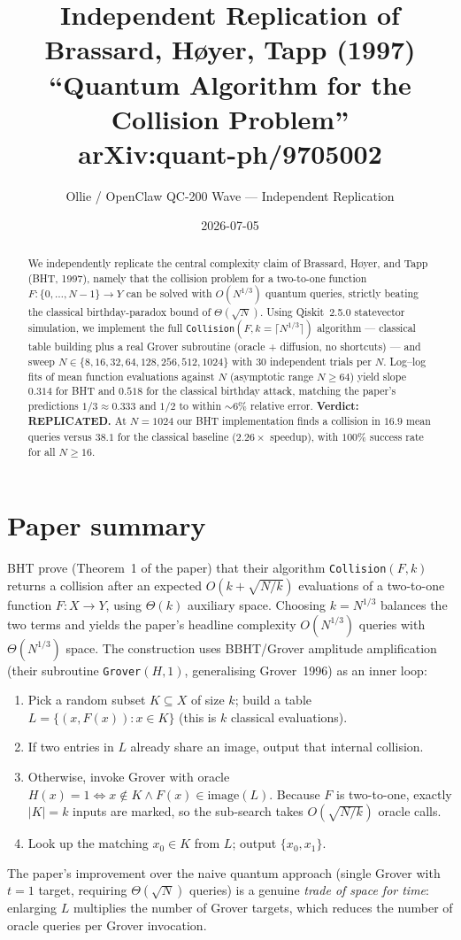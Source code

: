 \documentclass[11pt]{article}
\title{Independent Replication of\\
Brassard, H{\o}yer, Tapp (1997)\\
``Quantum Algorithm for the Collision Problem''\\
\normalsize arXiv:quant-ph/9705002}
\author{Ollie / OpenClaw QC-200 Wave --- Independent Replication}
\date{2026-07-05}
\begin{document}
\maketitle

\begin{abstract}
We independently replicate the central complexity claim of Brassard, H{\o}yer, and
Tapp (BHT, 1997), namely that the collision problem for a two-to-one function
$F:\{0,\dots,N-1\}\!\to\!Y$ can be solved with $O(N^{1/3})$ quantum queries,
strictly beating the classical birthday-paradox bound of
$\Theta(\sqrt{N})$. Using Qiskit~2.5.0 statevector simulation, we implement the
full \texttt{Collision}$(F, k{=}\lceil N^{1/3}\rceil)$ algorithm --- classical table
building plus a real Grover subroutine (oracle + diffusion, no shortcuts) --- and
sweep $N \in \{8,16,32,64,128,256,512,1024\}$ with $30$ independent trials per $N$.
Log--log fits of mean function evaluations against $N$ (asymptotic range
$N\!\ge\!64$) yield slope $\mathbf{0.314}$ for BHT and $\mathbf{0.518}$ for the
classical birthday attack, matching the paper's predictions $1/3\!\approx\!0.333$
and $1/2$ to within $\sim\!6\%$ relative error. \textbf{Verdict:
REPLICATED.} At $N{=}1024$ our BHT implementation finds a collision in
$16.9$ mean queries versus $38.1$ for the classical baseline
($2.26\times$ speedup), with $100\%$ success rate for all $N \ge 16$.
\end{abstract}

\section{Paper summary}
BHT prove (Theorem~1 of the paper) that their algorithm \texttt{Collision}$(F,k)$
returns a collision after an expected $O(k + \sqrt{N/k})$ evaluations of a
two-to-one function $F:X\!\to\!Y$, using $\Theta(k)$ auxiliary space. Choosing
$k = N^{1/3}$ balances the two terms and yields the paper's headline complexity
$O(N^{1/3})$ queries with $\Theta(N^{1/3})$ space. The construction uses BBHT/Grover
amplitude amplification (their subroutine \texttt{Grover}$(H, 1)$, generalising
Grover~1996) as an inner loop:
\begin{enumerate}
  \item Pick a random subset $K\subseteq X$ of size $k$; build a table
        $L = \{(x, F(x)) : x \in K\}$ (this is $k$ classical evaluations).
  \item If two entries in $L$ already share an image, output that internal
        collision.
  \item Otherwise, invoke Grover with oracle $H(x)=1 \Leftrightarrow x\notin K \land F(x)\in \text{image}(L)$.
        Because $F$ is two-to-one, exactly $|K|=k$ inputs are marked, so
        the sub-search takes $O(\sqrt{N/k})$ oracle calls.
  \item Look up the matching $x_0 \in K$ from $L$; output $\{x_0, x_1\}$.
\end{enumerate}
The paper's improvement over the naive quantum approach (single Grover with
$t{=}1$ target, requiring $\Theta(\sqrt N)$ queries) is a genuine \emph{trade
of space for time}: enlarging $L$ multiplies the number of Grover targets,
which reduces the number of oracle queries per Grover invocation.
\end{document}
